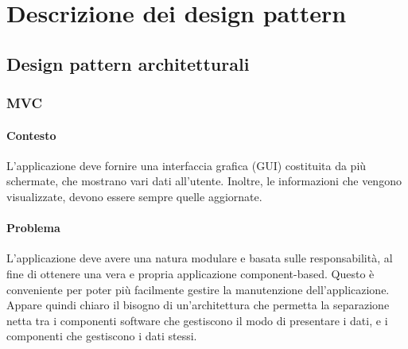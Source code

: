 \section{Descrizione dei design pattern}
\label{DDP}

\subsection{Design pattern architetturali}
\subsubsection{MVC}
\paragraph{Contesto\\}
L'applicazione deve fornire una interfaccia grafica (GUI\glossario{}) costituita da più schermate, che mostrano vari dati all'utente. Inoltre, le informazioni che vengono visualizzate, devono essere sempre quelle aggiornate.

\paragraph{Problema\\}
L'applicazione deve avere una natura modulare e basata sulle responsabilità, al fine di ottenere una vera e propria applicazione component-based. Questo è conveniente per poter più facilmente gestire la manutenzione dell'applicazione.\\
Appare quindi chiaro il bisogno di un'architettura che permetta la separazione netta tra i componenti software che gestiscono il modo di presentare i dati, e i componenti che gestiscono i dati stessi.

